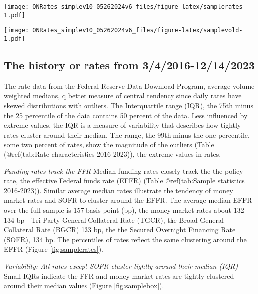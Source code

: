 \documentclass[
]{article}
\let\origfigure\figure
\let\endorigfigure\endfigure
\renewenvironment{figure}[1][2] {
    \expandafter\origfigure\expandafter[H]
} {
    \endorigfigure
}
\begin{document}
\begin{figure}
\centering
\texttt{[image: ONRates\_simplev10\_05262024v6\_files/figure-latex/samplerates-1.pdf]}
\caption{\label{fig:samplerates}EFFR percentiles of the sample 3/4/2016-12/14/2023}
\end{figure}

\begin{figure}
\centering
\texttt{[image: ONRates\_simplev10\_05262024v6\_files/figure-latex/samplevold-1.pdf]}
\caption{\label{fig:samplevold}Sample volumes of overnight rates 3/4/2016-12/14/2023}
\end{figure}

\hypertarget{the-history-or-rates-from-342016-12142023}{%
\subsection{The history or rates from 3/4/2016-12/14/2023}\label{the-history-or-rates-from-342016-12142023}}

The rate data from the Federal Reserve Data Download Program, average volume weighted medians, q better measure of central tendency since daily rates have skewed distributions with outliers. The Interquartile range (IQR), the 75th minus the 25 percentile of the data contains 50 percent of the data. Less influenced by extreme values, the IQR is a measure of variability that describes how tightly rates cluster around their median. The range, the 99th minus the one percentile, some two percent of rates, show the magnitude of the outliers (Table (@ref(tab:Rate characteristics 2016-2023)), the extreme values in rates.

\emph{Funding rates track the FFR}
Median funding rates closely track the the policy rate, the effective Federal funds rate (EFFR) (Table @ref(tab:Sample statistics 2016-2023)). Similar average median rates illustrate the tendency of money market rates and SOFR to cluster around the EFFR. The average median EFFR over the full sample is 157 basis point (bp), the money market rates about 132-134 bp - Tri-Party General Collateral Rate (TGCR), the Broad General Collateral Rate (BGCR) 133 bp, the the Secured Overnight Financing Rate (SOFR), 134 bp. The percentiles of rates reflect the same clustering around the EFFR (Figure \ref{fig:samplerates}).

\emph{Variability: All rates except SOFR cluster tightly around their median (IQR)}
Small IQRs indicate the FFR and money market rates are tightly clustered around their median values (Figure \ref{fig:samplebox}).
\end{document}
